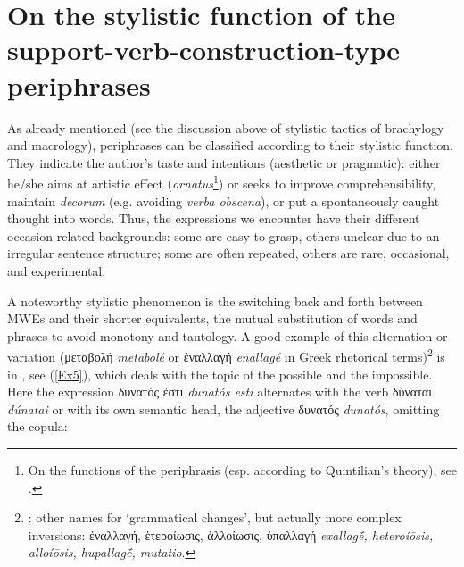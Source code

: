 \documentclass[output=paper,colorlinks,citecolor=brown]{langscibook}
\begin{document}
\section{On the stylistic function of the support-verb-construction-type periphrases}\label{Section7Rhet}

As already mentioned (see the discussion above of stylistic tactics of brachylogy and macrology), periphrases can be classified according to their stylistic function. They indicate the author’s taste and intentions (aesthetic or pragmatic): either he/she aims at artistic effect (\textit{ornatus}\footnote{On the functions of the periphrasis (esp. according to Quintilian’s theory), see \citet[§592, 269--270]{Lausberg1998}.}) or seeks to improve comprehensibility, maintain \textit{decorum} (e.g. avoiding \textit{verba obscena}), or put a spontaneously caught thought into words. Thus, the expressions we encounter have their different occasion-related backgrounds: some are easy to grasp, others unclear due to an irregular sentence structure; some are often repeated, others are rare, occasional, and experimental.

A noteworthy stylistic phenomenon is the switching back and forth between MWEs and their shorter equivalents, the mutual substitution of words and phrases to avoid monotony and tautology. A good example of this alternation or variation (μεταβολή \textit{metabolḗ} or ἐναλλαγή \textit{enallagḗ} in Greek rhetorical terms)\footnote{\citet[§509, 236]{Lausberg1998}: other names for ‘grammatical changes’, but actually more complex inversions: ἐναλλαγή, ἑτεροίωσις, ἀλλοίωσις, ὑπαλλαγή \textit{exallagḗ, heteroíōsis, alloíōsis, hupallagḗ, mutatio}.} is in , see (\ref{Ex5}), which deals with the topic of the possible and the impossible. Here the expression δυνατός ἐστι \textit{dunatós esti} alternates with the verb δύναται \textit{dúnatai} or with its own semantic head, the adjective δυνατός \textit{dunatós}, omitting the copula: 
\end{document}
